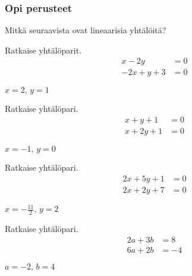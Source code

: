 \begin{tehtavasivu}

\subsubsection*{Opi perusteet}

\begin{tehtava}
  Mitkä seuraavista ovat lineaarisia yhtälöitä?
  \begin{vastaus}
  \end{vastaus}
\end{tehtava}

\begin{tehtava}
    Ratkaise yhtälöparit.
    \begin{align*}
        x-2y &= 0 \\
        -2x+y+3 &=0
    \end{align*}
    \begin{vastaus}
        $x = 2, \, y = 1$
    \end{vastaus}
\end{tehtava}

\begin{tehtava}
    Ratkaise yhtälöpari.
    \begin{align*}
        x+y+1 &= 0 \\
        x+2y+1 &=0
    \end{align*}
    \begin{vastaus}
        $x = -1, \, y = 0$
    \end{vastaus}
\end{tehtava}

\begin{tehtava}
    Ratkaise yhtälöpari.
    \begin{align*}
        2x+5y+1 &= 0 \\
        2x+2y+7 &=0
    \end{align*}
    \begin{vastaus}
        $x = -\frac{11}{2}, \, y = 2$
    \end{vastaus}
\end{tehtava}

\begin{tehtava}
    Ratkaise yhtälöpari.
    \begin{align*}
        2a+3b &= 8 \\
        6a+2b &= -4
    \end{align*}
    \begin{vastaus}
        $a = -2, \, b = 4$
    \end{vastaus}
\end{tehtava}


\end{tehtavasivu}
